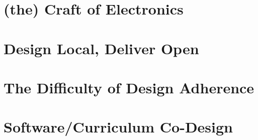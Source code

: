 


  
  \chapter{(the) Craft of Electronics}
  
  
  
  
  \chapter{Design Local, Deliver Open}
  
  \chapter{The Difficulty of Design Adherence}
  
  \chapter{Software/Curriculum Co-Design}
  
  
